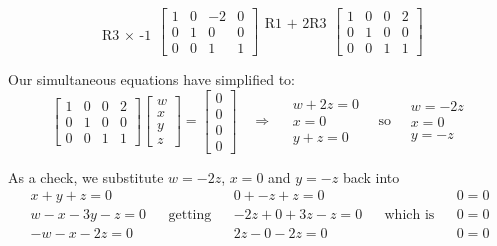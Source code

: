 \documentclass[12pt, a4paper, twoside, openright]{book}
\begin{document}
\begin{equation*}
\begin{matrix}
\\
\\
\text{R3 $\times$ -1} \\
\end{matrix}
\begin{bmatrix}
1  &  0 & -2 & 0 \\
0  &  1 & 0  & 0 \\
0  &  0 & 1  & 1
\end{bmatrix}
\begin{matrix}
\text{R1 + 2R3} \\
\\
\\
\end{matrix}
\begin{bmatrix}
1  &  0 & 0  & 2 \\
0  &  1 & 0  & 0 \\
0  &  0 & 1  & 1
\end{bmatrix}
\end{equation*}

Our simultaneous equations have simplified to:
\begin{equation*}
\begin{bmatrix}
1  &  0 & 0  & 2 \\
0  &  1 & 0  & 0 \\
0  &  0 & 1  & 1
\end{bmatrix}
\begin{bmatrix}
w \\ x \\ y \\ z
\end{bmatrix}
=
\begin{bmatrix}
0 \\ 0 \\ 0 \\ 0
\end{bmatrix}
\quad
\Rightarrow
\quad
\begin{matrix}
w + 2z  = 0 \\
x = 0 \\
y + z = 0
\end{matrix}
\quad \text{so} \quad
\begin{matrix}
w = -2z \\ x = 0 \\ y = -z
\end{matrix}
\end{equation*}

As a check, we substitute $w = -2z $, $x=0$ and $ y = -z $ back into
\begin{align*}
x + y + z = 0      & &                  & & 0 + -z +z = 0        & &                 & & 0 = 0 \\
w - x - 3y - z = 0 & & \mathrm{getting} & & -2z + 0 + 3z - z = 0 & & \text{which is} & & 0 = 0 \\
-w - x - 2z = 0    & &                  & & 2z - 0 - 2z = 0      & &                 & & 0 = 0
\end{align*}
\end{document}
